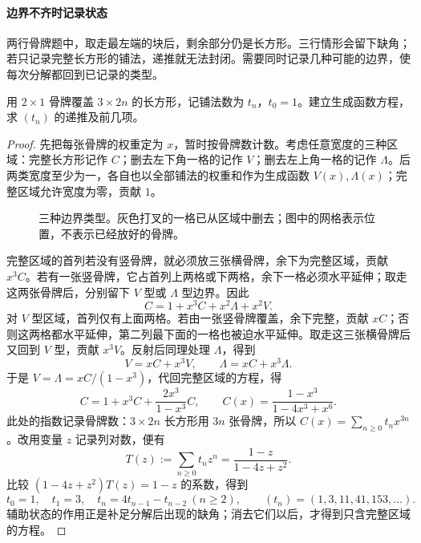 \documentclass[lang=cn,a4paper,fontset=none,zihao=false,10pt,openany,twoside]{beautybook}
\numberwithin{algorithm}{chapter}
\begin{document}
\paragraph{边界不齐时记录状态}
两行骨牌题中，取走最左端的块后，剩余部分仍是长方形。三行情形会留下缺角；若只记录完整长方形的铺法，递推就无法封闭。需要同时记录几种可能的边界，使每次分解都回到已记录的类型。
\begin{example}[三行骨牌覆盖]\label{ex:domino-three-rows-gf}
用 $2\times1$ 骨牌覆盖 $3\times2n$ 的长方形，记铺法数为 $t_n$，$t_0=1$。建立生成函数方程，求 $(t_n)$ 的递推及前几项。
\end{example}
\begin{proof}
先把每张骨牌的权重定为 $x$，暂时按骨牌数计数。考虑任意宽度的三种区域：完整长方形记作 $C$；删去左下角一格的记作 $V$；删去左上角一格的记作 $\Lambda$。后两类宽度至少为一，各自也以全部铺法的权重和作为生成函数 $V(x),\Lambda(x)$；完整区域允许宽度为零，贡献 $1$。
\begin{figure}[H]
\centering
{}
\caption{三种边界类型。灰色打叉的一格已从区域中删去；图中的网格表示位置，不表示已经放好的骨牌。}
\end{figure}

完整区域的首列若没有竖骨牌，就必须放三张横骨牌，余下为完整区域，贡献 $x^3C$。若有一张竖骨牌，它占首列上两格或下两格，余下一格必须水平延伸；取走这两张骨牌后，分别留下 $V$ 型或 $\Lambda$ 型边界。因此
\[
 C=1+x^3C+x^2\Lambda+x^2V.
\]
对 $V$ 型区域，首列仅有上面两格。若由一张竖骨牌覆盖，余下完整，贡献 $xC$；否则这两格都水平延伸，第二列最下面的一格也被迫水平延伸。取走这三张横骨牌后又回到 $V$ 型，贡献 $x^3V$。反射后同理处理 $\Lambda$，得到
\[
 V=xC+x^3V,\qquad \Lambda=xC+x^3\Lambda.
\]
于是 $V=\Lambda=xC/(1-x^3)$，代回完整区域的方程，得
\[
 C=1+x^3C+\frac{2x^3}{1-x^3}C,
 \qquad C(x)=\frac{1-x^3}{1-4x^3+x^6}.
\]
此处的指数记录骨牌数：$3\times2n$ 长方形用 $3n$ 张骨牌，所以 $C(x)=\sum_{n\ge0}t_nx^{3n}$。改用变量 $z$ 记录列对数，便有
\[
 T(z):=\sum_{n\ge0}t_nz^n=\frac{1-z}{1-4z+z^2}.
\]
比较 $(1-4z+z^2)T(z)=1-z$ 的系数，得到
\[
 t_0=1,\quad t_1=3,\quad
 t_n=4t_{n-1}-t_{n-2}\ (n\ge2),
 \qquad (t_n)=(1,3,11,41,153,\ldots).
\]
辅助状态的作用正是补足分解后出现的缺角；消去它们以后，才得到只含完整区域的方程。
\end{proof}
\end{document}
